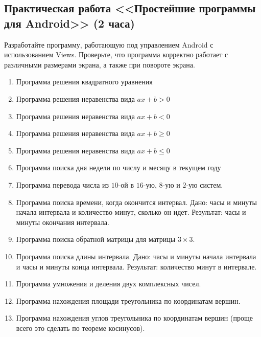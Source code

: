 \subsection{Практическая работа <<Простейшие программы для Android>> (2 часа)}

Разработайте программу, работающую под управлением Android с использованием Views. 
Проверьте, что программа корректно работает с различными размерами экрана,
а также при повороте экрана. 

\begin{enumerate}
 \item Программа решения квадратного уравнения
 \item Программа решения неравенства вида $ax+b>0$
    \item Программа решения неравенства вида $ax+b<0$
 \item Программа решения неравенства вида $ax+b\geqslant 0$
 \item Программа решения неравенства вида $ax+b\leqslant 0$
\item Программа поиска дня недели по числу и месяцу в текущем году
 \item  Программа перевода числа из $10$-ой в $16$-ую, $8$-ую и $2$-ую систем.
 \item  Программа поиска времени, когда окончится интервал. 
 Дано: часы и минуты начала интервала и количество минут, сколько он идет.
 Результат: часы и минуты окончания интервала.
  \item Программа поиска обратной матрицы для матрицы $3\times3$.
 \item
 Программа поиска длины интервала. 
 Дано: часы и минуты начала интервала и часы и минуты конца интервала.
 Результат: количество минут в интервале.
 \item
 Программа умножения и деления двух комплексных чисел.
 
 
 \item
 Программа нахождения площади треугольника по координатам вершин.
 
 \item
 Программа нахождения углов треугольника по координатам вершин (проще всего это сделать по теореме косинусов).


\end{enumerate}
